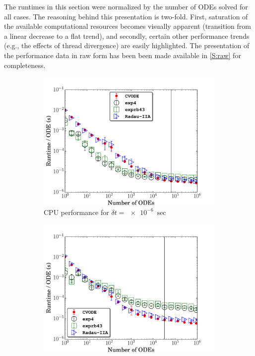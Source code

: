 \documentclass[final,twocolumn]{elsarticle}
\begin{document}
The runtimes in this section were normalized by the number of ODEs solved for all cases.
The reasoning behind this presentation is two-fold.
First, saturation of the available computational resources becomes visually apparent (transition from a linear decrease to a flat trend), and secondly, certain other performance trends (e.g., the effects of thread divergence) are easily highlighted.
The presentation of the performance data in raw form has been been made available in \ref{S:raw} for completeness.

\begin{figure}[htb]
  \ifmeasure
  \fontsize{8pt}{10pt}\selectfont
  \fi
  \centering
  \begin{subfigure}{0.49\textwidth}
      \includegraphics[width=\linewidth]{H2_1e-06_cpu.pdf}
      \caption{CPU performance for $\delta t = \SI{e-6}{\sec}$}
      \label{F:h2_cpu_perf_small}
  \end{subfigure}
  \begin{subfigure}{0.49\textwidth}
      \includegraphics[width=\linewidth]{H2_1e-04_cpu.pdf}

\end{subfigure}
\end{figure}
\end{document}
